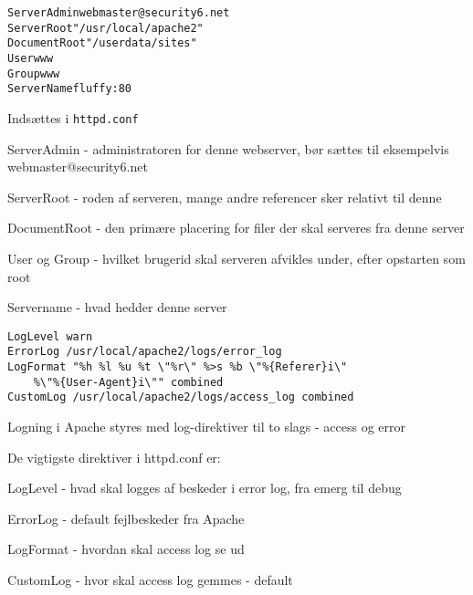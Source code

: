 
\begin{alltt}\small
ServerAdmin webmaster@security6.net
ServerRoot "/usr/local/apache2"
DocumentRoot "/userdata/sites" 
User www
Group www
ServerName fluffy:80
\end{alltt}

\begin{list2}
\item Indsættes i \verb+httpd.conf+
\item ServerAdmin - administratoren for denne webserver, bør sættes
  til eksempelvis webmaster@security6.net
\item ServerRoot - roden af serveren, mange andre referencer sker
  relativt til denne
\item DocumentRoot - den primære placering for filer der skal serveres
  fra denne server 
\item User og Group - hvilket brugerid skal serveren afvikles under,
  efter opstarten som root
\item Servername - hvad hedder denne server
\end{list2}



\begin{verbatim}
LogLevel warn 
ErrorLog /usr/local/apache2/logs/error_log 
LogFormat "%h %l %u %t \"%r\" %>s %b \"%{Referer}i\" 
    %\"%{User-Agent}i\"" combined
CustomLog /usr/local/apache2/logs/access_log combined   
\end{verbatim}

\begin{list1}
\item Logning i Apache styres med log-direktiver til to slags - access
  og error 
\item De vigtigste direktiver i httpd.conf er:
\begin{list2}
\item LogLevel - hvad skal logges af beskeder i error log, fra emerg til debug
\item ErrorLog - default fejlbeskeder fra Apache 
\item LogFormat - hvordan skal access log se ud
\item CustomLog - hvor skal access log gemmes - default    
\end{list2}
\end{list1}

